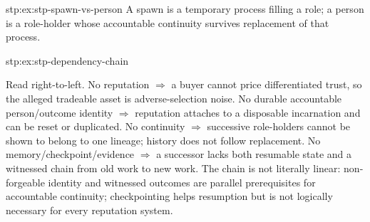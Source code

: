 \begin{pdSolution}{stp:ex:stp-spawn-vs-person}
A spawn is a temporary process filling a role; a person is a role-holder whose
accountable continuity survives replacement of that process.
\end{pdSolution}
\begin{pdSolution}{stp:ex:stp-dependency-chain}
\par\smallskip
\begin{center}
%
\end{center}
\par\smallskip
Read right-to-left. No reputation $\Rightarrow$ a buyer cannot price
differentiated trust, so the alleged tradeable asset is adverse-selection
noise. No durable accountable person/outcome identity $\Rightarrow$ reputation
attaches to a disposable incarnation and can be reset or duplicated. No
continuity $\Rightarrow$ successive role-holders cannot be shown to belong to
one lineage; history does not follow replacement. No memory/checkpoint/evidence
$\Rightarrow$ a successor lacks both resumable state and a witnessed chain from
old work to new work. The chain is not literally linear: non-forgeable identity
and witnessed outcomes are parallel prerequisites for accountable continuity;
checkpointing helps resumption but is not logically necessary for every
reputation system.
\end{pdSolution}
